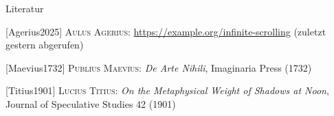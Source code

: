 \begin{frame}{Literatur}
    \begin{thebibliography}{16}
        [Agerius2025] \textsc{Aulus Agerius}: \url{https://example.org/infinite-scrolling} (zuletzt gestern abgerufen)

        [Maevius1732] \textsc{Publius Maevius}: \textit{De Arte Nihili}, Imaginaria Press (1732)

        [Titius1901] \textsc{Lucius Titius}: \textit{On the Metaphysical Weight of Shadows at Noon}, Journal of Speculative Studies 42 (1901)
    \end{thebibliography}
\end{frame}
